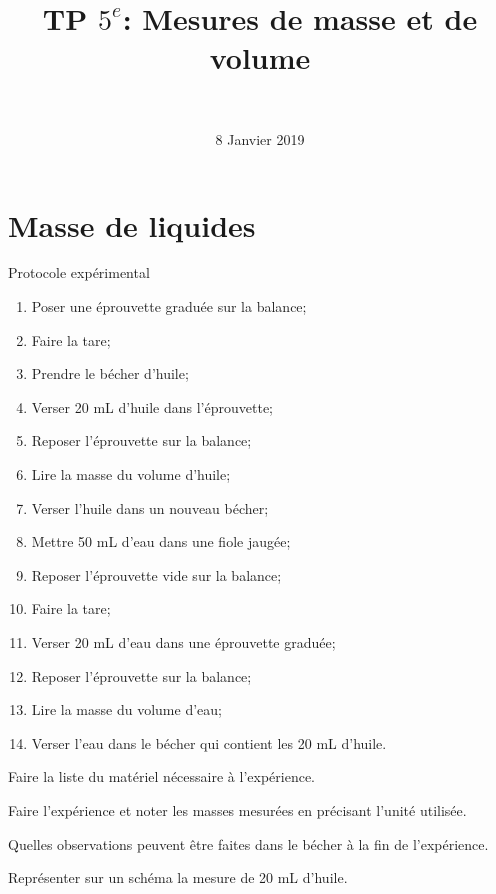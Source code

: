 \documentclass[a4paper,11pt]{exam}
\author{\ }
\date{8 Janvier 2019}
\title{TP $5^e$: Mesures de masse et de volume}
\begin{document}
	\maketitle

\section{Masse de liquides}\label{part:liquide}

\begin{doc}
	\caption{Protocole expérimental}
	\label{doc:proto1}
	\begin{multicols}{2}
			
		\begin{enumerate}[label=\arabic*)]
			
			\item Poser une éprouvette graduée sur la balance;
			\item Faire la tare;
			\item Prendre le bécher d'huile;
			\item Verser 20 mL d'huile dans l'éprouvette;
			\item Reposer l'éprouvette sur la balance;
			\item Lire la masse du volume d'huile;
			\item Verser l'huile dans un nouveau bécher;
			\item Mettre 50 mL d'eau dans une fiole jaugée;
			\item Reposer l'éprouvette vide sur la balance;
			\item Faire la tare;
			\item Verser 20 mL d'eau dans une éprouvette graduée;
			\item Reposer l'éprouvette sur la balance;
			\item Lire la masse du volume d'eau;
			\item Verser l'eau dans le bécher qui contient les 20 mL d'huile.
			
			
		\end{enumerate}
	\end{multicols}
\end{doc}	


\begin{questions}
	
	
	\question Faire la liste du matériel nécessaire à l'expérience.
	
	\fillwithdottedlines{3cm}
	
	\question Faire l'expérience et noter les masses mesurées en précisant l'unité utilisée.
	
	\fillwithdottedlines{1cm}	
	
	\question Quelles observations peuvent être faites dans le bécher à la fin de l'expérience.
	\fillwithdottedlines{1.5cm}
	
	\question Représenter sur un schéma la mesure de 20 mL d'huile.
	
	\makeemptybox{5.5cm}
\end{questions}
\end{document}

